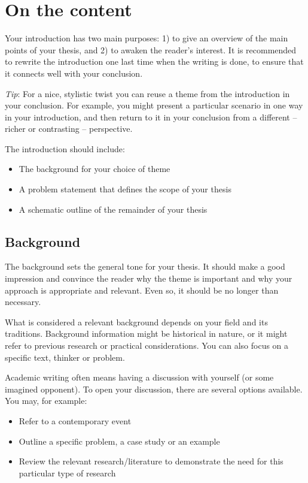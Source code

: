 \documentclass[a4paper,twoside]{bth}
\begin{document}
\section{On the content}
Your introduction has two main purposes: 1) to give an overview of the main points of your thesis, and 2) to awaken the reader's interest. It is recommended to rewrite the introduction one last time when the writing is done, to ensure that it connects well with your conclusion.

\emph{Tip}: For a nice, stylistic twist you can reuse a theme from the introduction in your conclusion. For example, you might present a particular scenario in one way in your introduction, and then return to it in your conclusion from a different -- richer or contrasting -- perspective.

The introduction should include:
\begin{itemize}
    \item The background for your choice of theme
    \item A problem statement that defines the scope of your thesis
    \item A schematic outline of the remainder of your thesis
\end{itemize}

\subsection{Background}
The background sets the general tone for your thesis. It should make a good impression and convince the reader why the theme is important and why your approach is appropriate and relevant. Even so, it should be no longer than necessary.

What is considered a relevant background depends on your field and its traditions. Background information might be historical in nature, or it might refer to previous research or practical considerations. You can also focus on a specific text, thinker or problem.

Academic writing often means having a discussion with yourself (or some imagined opponent). To open your discussion, there are several options available. You may, for example:
\begin{itemize}
    \item Refer to a contemporary event
    \item Outline a specific problem, a case study or an example
    \item Review the relevant research/literature to demonstrate the need for this particular type of research
\end{itemize}
\end{document}
